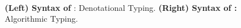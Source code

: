 
\begin{figure}[t]
\begin{minipage}[t]{0.49\textwidth}

\end{minipage}
\ \
\begin{minipage}[t]{0.49\textwidth}

\end{minipage}

\label{fig:lang-syntax}
\caption{\textbf{(Left) Syntax of \corelan}: Denotational Typing.
         \quad
         \textbf{(Right) Syntax of \smtlan:} Algorithmic Typing.
         }
\label{fig:syntax}
\label{fig:smtsyntax}
\figrule
\end{figure}
